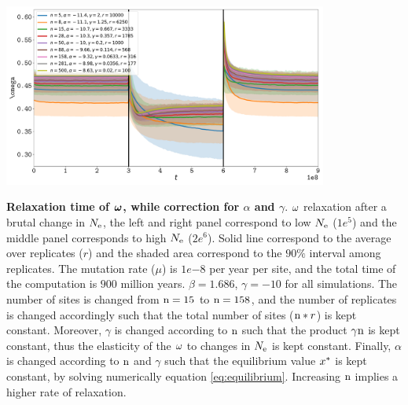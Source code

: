 \documentclass{article}
\begin{document}
\begin{center}
	\includegraphics[width=0.8\textwidth] {artworks/Relaxation-Stability-Alpha-Gamma.pdf}
\end{center}
\textbf{Relaxation time of $\bm{\omega}$, while correction for $\alpha$ and $\gamma$}.
$\omega$ relaxation after a brutal change in $N_{\mathrm{e}}$, the left and right panel correspond to low $N_{\mathrm{e}}$ ($1e^{5}$) and the middle panel corresponds to high $N_{\mathrm{e}}$ ($2e^{6}$). 
Solid line correspond to the average over replicates ($r$) and the shaded area correspond to the $90\%$ interval among replicates. 
The mutation rate ($\mu$) is $1e{-8}$ per year per site, and the total time of the computation is $900$ million years.
$\beta=1.686$, $\gamma=-10$ for all simulations. The number of sites is changed from $\text{n}=15$ to $\text{n}=158$, and the number of replicates is changed accordingly such that the total number of sites ($\text{n}*r$) is kept constant.
Moreover, $\gamma$ is changed according to $\text{n}$ such that the product $\gamma\text{n}$ is kept constant, thus the  elasticity of the $\omega$ to changes in $N_{\mathrm{e}}$ is kept constant.
Finally, $\alpha$ is changed according to $\text{n}$ and $\gamma$ such that the equilibrium value $x^{*}$ is kept constant, by solving numerically equation \ref{eq:equilibrium}.
Increasing $\text{n}$ implies a higher rate of relaxation.
\end{document}
